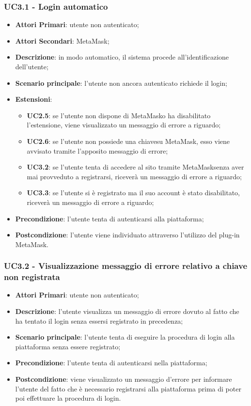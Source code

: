 \subsubsection{UC3.1 - Login automatico}
\begin{itemize}
	\item \textbf{Attori Primari}:
	utente non autenticato;
	\item \textbf{Attori Secondari}:
	MetaMask\glo;
	\item \textbf{Descrizione}:
	in modo automatico, il sistema procede all'identificazione dell'utente;
	\item \textbf{Scenario principale}:
	l'utente non ancora autenticato richiede il login;
	\item \textbf{Estensioni}:
	\begin{itemize}
		\item \textbf{UC2.5}: se l'utente non dispone di MetaMask\glosp o ha disabilitato l'estensione, viene visualizzato un messaggio di errore a riguardo;
		\item \textbf{UC2.6}: se l'utente non possiede una chiave\glosp su MetaMask\glo, esso viene avvisato tramite l'apposito messaggio di errore;
		\item \textbf{UC3.2}: se l'utente tenta di accedere al sito tramite MetaMask\glosp senza aver mai provveduto a registrarsi, riceverà un messaggio di errore a riguardo;
		
		\item \textbf{UC3.3}: se l'utente si è registrato ma il suo account è stato disabilitato, riceverà un messaggio di errore a riguardo;
	\end{itemize}
	\item \textbf{Precondizione}:
	l'utente tenta di autenticarsi alla piattaforma;
	\item \textbf{Postcondizione}:
	l'utente viene individuato attraverso l'utilizzo del plug-in MetaMask\glo.
\end{itemize}
\subsubsection{UC3.2 - Visualizzazione messaggio di errore relativo a chiave non registrata}
\begin{itemize}
	\item \textbf{Attori Primari}:
	utente non autenticato;
	\item \textbf{Descrizione}:
	l'utente visualizza un messaggio di errore dovuto al fatto che ha tentato il login senza essersi registrato in precedenza;
	\item \textbf{Scenario principale}:
	l'utente tenta di eseguire la procedura di login alla piattaforma senza essere registrato;
	\item \textbf{Precondizione}:
	l'utente tenta di autenticarsi nella piattaforma;
	\item \textbf{Postcondizione}: viene visualizzato un messaggio d'errore per informare l'utente del fatto che è necessario registrarsi alla piattaforma prima di poter poi effettuare la procedura di login.
\end{itemize}
